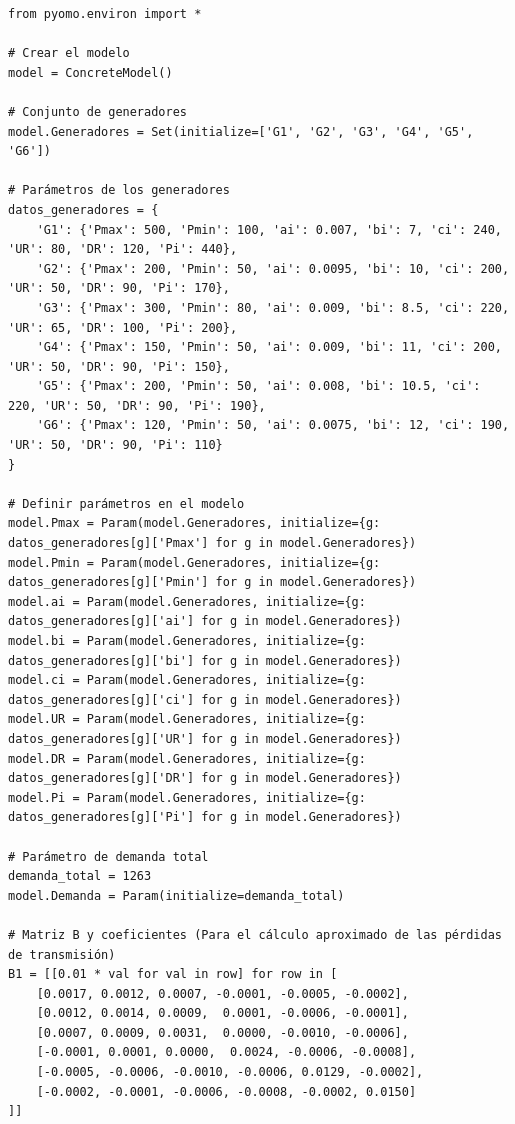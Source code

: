 \documentclass[11pt]{article}
\begin{document}
\begin{lstlisting}[style=mypython, caption={Modelo de Despacho Económico con Pyomo}]
from pyomo.environ import *
    
# Crear el modelo
model = ConcreteModel()
    
# Conjunto de generadores
model.Generadores = Set(initialize=['G1', 'G2', 'G3', 'G4', 'G5', 'G6'])
    
# Parámetros de los generadores
datos_generadores = {
    'G1': {'Pmax': 500, 'Pmin': 100, 'ai': 0.007, 'bi': 7, 'ci': 240, 'UR': 80, 'DR': 120, 'Pi': 440},
    'G2': {'Pmax': 200, 'Pmin': 50, 'ai': 0.0095, 'bi': 10, 'ci': 200, 'UR': 50, 'DR': 90, 'Pi': 170},
    'G3': {'Pmax': 300, 'Pmin': 80, 'ai': 0.009, 'bi': 8.5, 'ci': 220, 'UR': 65, 'DR': 100, 'Pi': 200},
    'G4': {'Pmax': 150, 'Pmin': 50, 'ai': 0.009, 'bi': 11, 'ci': 200, 'UR': 50, 'DR': 90, 'Pi': 150},
    'G5': {'Pmax': 200, 'Pmin': 50, 'ai': 0.008, 'bi': 10.5, 'ci': 220, 'UR': 50, 'DR': 90, 'Pi': 190},
    'G6': {'Pmax': 120, 'Pmin': 50, 'ai': 0.0075, 'bi': 12, 'ci': 190, 'UR': 50, 'DR': 90, 'Pi': 110}
}
    
# Definir parámetros en el modelo
model.Pmax = Param(model.Generadores, initialize={g: datos_generadores[g]['Pmax'] for g in model.Generadores})
model.Pmin = Param(model.Generadores, initialize={g: datos_generadores[g]['Pmin'] for g in model.Generadores})
model.ai = Param(model.Generadores, initialize={g: datos_generadores[g]['ai'] for g in model.Generadores})
model.bi = Param(model.Generadores, initialize={g: datos_generadores[g]['bi'] for g in model.Generadores})
model.ci = Param(model.Generadores, initialize={g: datos_generadores[g]['ci'] for g in model.Generadores})
model.UR = Param(model.Generadores, initialize={g: datos_generadores[g]['UR'] for g in model.Generadores})
model.DR = Param(model.Generadores, initialize={g: datos_generadores[g]['DR'] for g in model.Generadores})
model.Pi = Param(model.Generadores, initialize={g: datos_generadores[g]['Pi'] for g in model.Generadores})
    
# Parámetro de demanda total
demanda_total = 1263
model.Demanda = Param(initialize=demanda_total)
    
# Matriz B y coeficientes (Para el cálculo aproximado de las pérdidas de transmisión)
B1 = [[0.01 * val for val in row] for row in [
    [0.0017, 0.0012, 0.0007, -0.0001, -0.0005, -0.0002],
    [0.0012, 0.0014, 0.0009,  0.0001, -0.0006, -0.0001],
    [0.0007, 0.0009, 0.0031,  0.0000, -0.0010, -0.0006],
    [-0.0001, 0.0001, 0.0000,  0.0024, -0.0006, -0.0008],
    [-0.0005, -0.0006, -0.0010, -0.0006, 0.0129, -0.0002],
    [-0.0002, -0.0001, -0.0006, -0.0008, -0.0002, 0.0150]
]]
    

\end{lstlisting}
\end{document}

